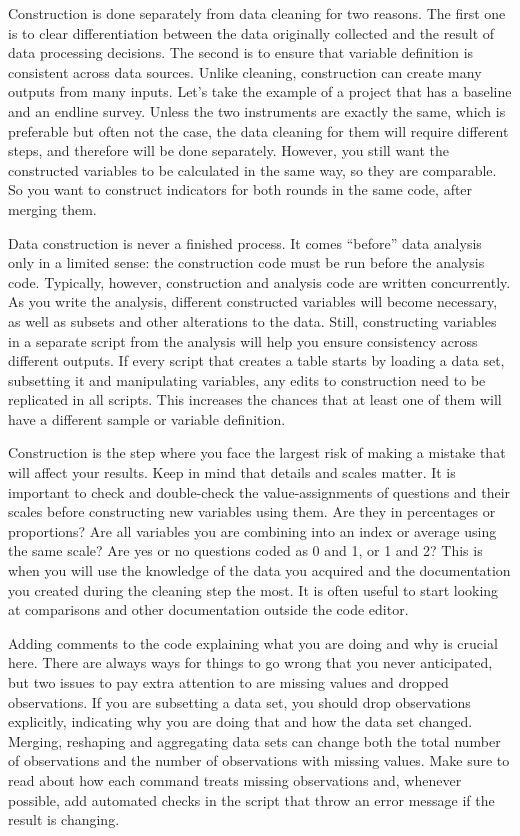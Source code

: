 Construction is done separately from data cleaning for two reasons. 
The first one is to clear differentiation between the data originally collected and the result of data processing decisions.
The second is to ensure that variable definition is consistent across data sources. 
Unlike cleaning, construction can create many outputs from many inputs. 
Let's take the example of a project that has a baseline and an endline survey. 
Unless the two instruments are exactly the same, which is preferable but often not the case,  the data cleaning for them will require different steps, and therefore will be done separately. 
However, you still want the constructed variables to be calculated in the same way, so they are comparable.
So you want to construct indicators for both rounds in the same code, after merging them.

Data construction is never a finished process.
It comes ``before'' data analysis only in a limited sense: the construction code must be run before the analysis code.
Typically, however, construction and analysis code are written concurrently.
As you write the analysis, different constructed variables will become necessary, as well as subsets and other alterations to the data.
Still, constructing variables in a separate script from the analysis will help you ensure consistency across different outputs. 
If every script that creates a table starts by loading a data set, subsetting it and manipulating variables, any edits to construction need to be replicated in all scripts. 
This increases the chances that at least one of them will have a different sample or variable definition.


Construction is the step where you face the largest risk of making a mistake that will affect your results. 
Keep in mind that details and scales matter. 
It is important to check and double-check the value-assignments of questions and their scales before constructing new variables using them. 
Are they in percentages or proportions? 
Are all variables you are combining into an index or average using the same scale? 
Are yes or no questions coded as 0 and 1, or 1 and 2?
This is when you will use the knowledge of the data you acquired and the documentation you created during the cleaning step the most.
It is often useful to start looking at comparisons and other documentation 
outside the code editor.

Adding comments to the code explaining what you are doing and why is crucial here.
There are always ways for things to go wrong that you never anticipated, but two issues to pay extra attention to are missing values and dropped observations. 
If you are subsetting a data set, you should drop observations explicitly, indicating why you are doing that and how the data set changed.
Merging, reshaping and aggregating data sets can change both the total number of observations and the number of observations with missing values.
Make sure to read about how each command treats missing observations and, whenever possible, add automated checks in the script that throw an error message if the result is changing.

